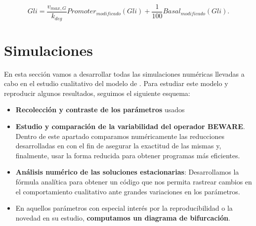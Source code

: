 \begin{equation}
 Gli=\frac{v_{max,G}}{k_{deg}}Promoter_{modificado}(Gli)+\frac{1}{100}Basal_{modificado}(Gli).
 \label{final_gli}
 \end{equation}


\section{Simulaciones}

En esta sección vamos a desarrollar todas las simulaciones numéricas llevadas a cabo en el estudio cualitativo del modelo de \cite{schaffer}.
Para estudiar este modelo y reproducir algunos resultados, seguimos el siguiente esquema:
\begin{itemize}
	\item \textbf{Recolección y contraste de los parámetros} usados
	\item \textbf{Estudio y comparación de la variabilidad del operador BEWARE}. Dentro de este apartado comparamos numéricamente las reducciones desarrolladas en \cite{multiple} con el fin de asegurar la exactitud de las mismas y, finalmente, usar la forma reducida para obtener programas más eficientes.
	\item \textbf{Análisis numérico de las soluciones estacionarias}: Desarrollamos la fórmula analítica para obtener un código que nos permita rastrear cambios en el comportamiento cualitativo ante grandes variaciones en los parámetros.
	\item En aquellos parámetros con especial interés por la reproducibilidad o la novedad en su estudio, \textbf{computamos un diagrama de bifurcación}.
\end{itemize}
